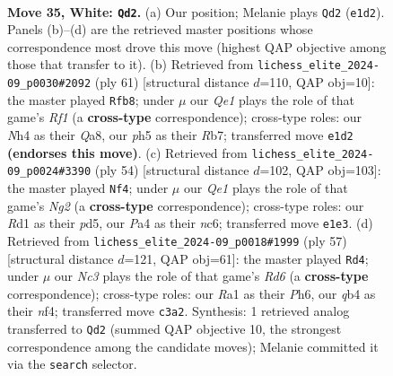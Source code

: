 \documentclass[11pt]{article}
\begin{document}
\begin{figure}[p]\centering
\begin{subfigure}{0.46\textwidth}\centering
\resizebox{\linewidth}{!}{%
\newchessgame
\chessboard[
  setfen={3r2k1/3n2p1/1p3n2/r2p3p/Pq2p2N/2N3P1/2P2P1P/R2RQK2 w - - 4 35},
  showmover=false,
  pgfstyle=straightmove, color=movearrow, markmove={e1-d2}
]}
\caption{}
\end{subfigure}\hfill
\begin{subfigure}{0.46\textwidth}\centering
\resizebox{\linewidth}{!}{%
\newchessgame
\chessboard[
  setfen={q4rk1/1r3pb1/5np1/4p1Np/2Q1P2P/3NRP2/PP4P1/1KR5 b - - 0 31},
  showmover=false,
  pgfstyle=straightmove, color=movearrow, markmove={f8-b8}
]}
\caption{}
\end{subfigure}
\\[4pt]
\begin{subfigure}{0.46\textwidth}\centering
\resizebox{\linewidth}{!}{%
\newchessgame
\chessboard[
  setfen={1k1r4/pp6/2n2qpr/3p1p2/3Pn1pN/6P1/PPQ2PN1/1K1R3R w - - 2 28},
  showmover=false,
  pgfstyle=straightmove, color=movearrow, markmove={g2-f4}
]}
\caption{}
\end{subfigure}\hfill
\begin{subfigure}{0.46\textwidth}\centering
\resizebox{\linewidth}{!}{%
\newchessgame
\chessboard[
  setfen={4qr1k/1p4p1/p2p3p/4n3/2P2N2/1P1r3P/P3Q1P1/5RNK b - - 7 29},
  showmover=false,
  pgfstyle=straightmove, color=movearrow, markmove={d3-d4}
]}
\caption{}
\end{subfigure}
\caption{\textbf{Move 35, White: \texttt{Qd2}.} (a) Our position; Melanie plays \texttt{Qd2} (\texttt{e1d2}). Panels (b)--(d) are the retrieved master positions whose correspondence most drove this move (highest QAP objective among those that transfer to it). (b) Retrieved from \texttt{lichess\_elite\_2024-09\_p0030\#2092} (ply 61) [structural distance $d$=110, QAP obj=10]: the master played \texttt{Rfb8}; under $\mu$ our \emph{Qe1} plays the role of that game's \emph{Rf1} (a \textbf{cross-type} correspondence); cross-type roles: our \emph{N}h4 as their \emph{Q}a8, our \emph{p}h5 as their \emph{R}b7; transferred move \texttt{e1d2} \textbf{(endorses this move)}. (c) Retrieved from \texttt{lichess\_elite\_2024-09\_p0024\#3390} (ply 54) [structural distance $d$=102, QAP obj=103]: the master played \texttt{Nf4}; under $\mu$ our \emph{Qe1} plays the role of that game's \emph{Ng2} (a \textbf{cross-type} correspondence); cross-type roles: our \emph{R}d1 as their \emph{p}d5, our \emph{P}a4 as their \emph{n}c6; transferred move \texttt{e1e3}. (d) Retrieved from \texttt{lichess\_elite\_2024-09\_p0018\#1999} (ply 57) [structural distance $d$=121, QAP obj=61]: the master played \texttt{Rd4}; under $\mu$ our \emph{Nc3} plays the role of that game's \emph{Rd6} (a \textbf{cross-type} correspondence); cross-type roles: our \emph{R}a1 as their \emph{P}h6, our \emph{q}b4 as their \emph{n}f4; transferred move \texttt{c3a2}. Synthesis: 1 retrieved analog transferred to \texttt{Qd2} (summed QAP objective 10, the strongest correspondence among the candidate moves); Melanie committed it via the \texttt{search} selector.}
\label{fig:thought-m68}
\end{figure}
\end{document}
